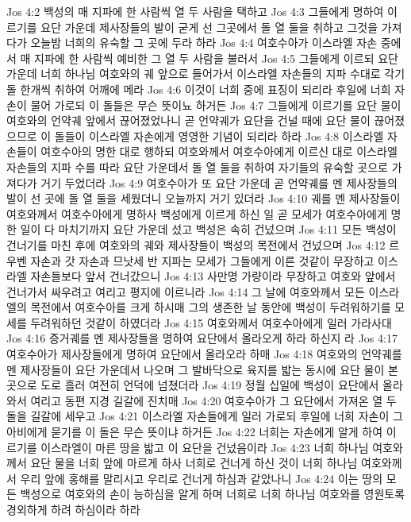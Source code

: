 Jos 4:2  백성의 매 지파에 한 사람씩 열 두 사람을 택하고
Jos 4:3  그들에게 명하여 이르기를 요단 가운데 제사장들의 발이 굳게 선 그곳에서 돌 열 둘을 취하고 그것을 가져다가 오늘밤 너희의 유숙할 그 곳에 두라 하라
Jos 4:4  여호수아가 이스라엘 자손 중에서 매 지파에 한 사람씩 예비한 그 열 두 사람을 불러서
Jos 4:5  그들에게 이르되 요단 가운데 너희 하나님 여호와의 궤 앞으로 들어가서 이스라엘 자손들의 지파 수대로 각기 돌 한개씩 취하여 어깨에 메라
Jos 4:6  이것이 너희 중에 표징이 되리라 후일에 너희 자손이 물어 가로되 이 돌들은 무슨 뜻이뇨 하거든
Jos 4:7  그들에게 이르기를 요단 물이 여호와의 언약궤 앞에서 끊어졌었나니 곧 언약궤가 요단을 건널 때에 요단 물이 끊어졌으므로 이 돌들이 이스라엘 자손에게 영영한 기념이 되리라 하라
Jos 4:8  이스라엘 자손들이 여호수아의 명한 대로 행하되 여호와께서 여호수아에게 이르신 대로 이스라엘 자손들의 지파 수를 따라 요단 가운데서 돌 열 둘을 취하여 자기들의 유숙할 곳으로 가져다가 거기 두었더라
Jos 4:9  여호수아가 또 요단 가운데 곧 언약궤를 멘 제사장들의 발이 선 곳에 돌 열 둘을 세웠더니 오늘까지 거기 있더라
Jos 4:10  궤를 멘 제사장들이 여호와께서 여호수아에게 명하사 백성에게 이르게 하신 일 곧 모세가 여호수아에게 명한 일이 다 마치기까지 요단 가운데 섰고 백성은 속히 건넜으며
Jos 4:11  모든 백성이 건너기를 마친 후에 여호와의 궤와 제사장들이 백성의 목전에서 건넜으며
Jos 4:12  르우벤 자손과 갓 자손과 므낫세 반 지파는 모세가 그들에게 이른 것같이 무장하고 이스라엘 자손들보다 앞서 건너갔으니
Jos 4:13  사만명 가량이라 무장하고 여호와 앞에서 건너가서 싸우려고 여리고 평지에 이르니라
Jos 4:14  그 날에 여호와께서 모든 이스라엘의 목전에서 여호수아를 크게 하시매 그의 생존한 날 동안에 백성이 두려워하기를 모세를 두려워하던 것같이 하였더라
Jos 4:15  여호와께서 여호수아에게 일러 가라사대
Jos 4:16  증거궤를 멘 제사장들을 명하여 요단에서 올라오게 하라 하신지 라
Jos 4:17  여호수아가 제사장들에게 명하여 요단에서 올라오라 하매
Jos 4:18  여호와의 언약궤를 멘 제사장들이 요단 가운데서 나오며 그 발바닥으로 육지를 밟는 동시에 요단 물이 본 곳으로 도로 흘러 여전히 언덕에 넘쳤더라
Jos 4:19  정월 십일에 백성이 요단에서 올라와서 여리고 동편 지경 길갈에 진치매
Jos 4:20  여호수아가 그 요단에서 가져온 열 두 돌을 길갈에 세우고
Jos 4:21  이스라엘 자손들에게 일러 가로되 후일에 너희 자손이 그 아비에게 묻기를 이 돌은 무슨 뜻이냐 하거든
Jos 4:22  너희는 자손에게 알게 하여 이르기를 이스라엘이 마른 땅을 밟고 이 요단을 건넜음이라
Jos 4:23  너희 하나님 여호와께서 요단 물을 너희 앞에 마르게 하사 너희로 건너게 하신 것이 너희 하나님 여호와께서 우리 앞에 홍해를 말리시고 우리로 건너게 하심과 같았나니
Jos 4:24  이는 땅의 모든 백성으로 여호와의 손이 능하심을 알게 하며 너희로 너희 하나님 여호와를 영원토록 경외하게 하려 하심이라 하라
